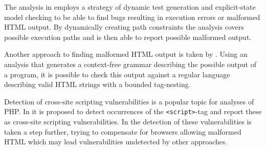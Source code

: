 The analysis in  employs a strategy of dynamic test generation and explicit-state model checking to be able to find bugs resulting in execution errors or malformed HTML output. By dynamically creating path constraints the analysis covers possible execution paths and is then able to report possible malformed output.

Another approach to finding malformed HTML output is taken by . Using an analysis that generates a context-free grammar describing the possible output of a program, it is possible to check this output against a regular language describing valid HTML strings with a bounded tag-nesting.

Detection of cross-site scripting vulnerabilities is a popular topic for analyses of PHP. In  it is proposed to detect occurrences of the \texttt{<script>}-tag and report these as cross-site scripting vulnerabilities. In  the detection of these vulnerabilities is taken a step further, trying to compensate for browsers allowing malformed HTML which may lead vulnerabilities undetected by other approaches.